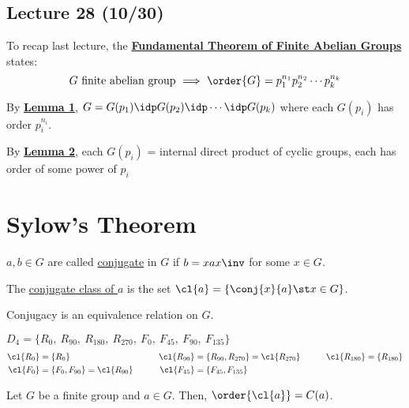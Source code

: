 \subsection*{Lecture 28 (10/30)} %

To recap last lecture, the \ul{\textbf{Fundamental Theorem of Finite Abelian Groups}} states:
\[\text{\(G\) finite abelian group \(\implies\) \(\order{G} = p_1^{n_1}p_2^{n_2}\cdots p_k^{n_k}\)}\]

By \ul{\textbf{Lemma 1}}, \(G = G(p_1) \idp G(p_2) \idp \cdots \idp G(p_k)\) where each \(G(p_i)\) has order \(p_i^{n_i}\).

By \ul{\textbf{Lemma 2}}, each \(G(p_i)\) = internal direct product of cyclic groups, each has order of some power of \(p_i\)

\setcounter{section}{23}
\section{Sylow's Theorem}

\begin{definition}

    \(a,b\in G\) are called \ul{conjugate} in \(G\) if \(b=xax\inv\) for some \(x\in G\).

    The \ul{conjugate class of \(a\)} is the set \(\cl{a} = \{\conj{x}{a} \st x\in G\}\).
\end{definition}

\begin{remark}
    Conjugacy is an equivalence relation on \(G\).
\end{remark}

\begin{example}
    \(D_4 = \{ R_{0},\  R_{90},\  R_{180},\  R_{270},\  F_{0},\  F_{45},\ F_{90},\ F_{135} \}\)
    \begin{align*}
        \cl{R_{0}} &= \{R_{0}\} \qquad & \cl{R_{90}}&=\{R_{90}, R_{270}\} = \cl{R_{270}} \qquad & \cl{R_{180}} &= \{R_{180}\} \\
            \cl{F_{0}} &= \{F_{0}, F_{90}\} = \cl{R_{90}} \qquad & \cl{F_{45}} &= \{F_{45}, F_{135}\}
    \end{align*}
\end{example}

\begin{theorem}[24.1]
    Let \(G\) be a finite group and \(a\in G\). Then, \(\order{\cl{a}}=\index{G}{C(a)}\).
\end{theorem}

